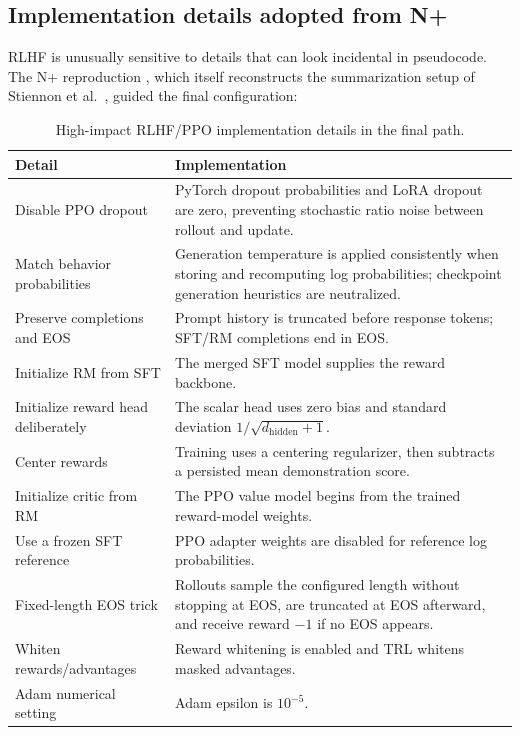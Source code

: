 \documentclass[11pt]{article}
\begin{document}
\subsection{Implementation details adopted from N+}

RLHF is unusually sensitive to details that can look incidental in pseudocode.
The N+ reproduction \cite{huang2024}, which itself reconstructs the
summarization setup of Stiennon et al.\ \cite{stiennon2020}, guided the final
configuration:

\begin{table}[H]
\centering
\small
\caption{High-impact RLHF/PPO implementation details in the final path.}
\label{tab:nplus}
\begin{tabularx}{\textwidth}{@{}p{}Y@{}}
\toprule
\textbf{Detail} & \textbf{Implementation}\\
\midrule
Disable PPO dropout &
PyTorch dropout probabilities and LoRA dropout are zero, preventing stochastic
ratio noise between rollout and update.\\
Match behavior probabilities &
Generation temperature is applied consistently when storing and recomputing
log probabilities; checkpoint generation heuristics are neutralized.\\
Preserve completions and EOS &
Prompt history is truncated before response tokens; SFT/RM completions end in
EOS.\\
Initialize RM from SFT &
The merged SFT model supplies the reward backbone.\\
Initialize reward head deliberately &
The scalar head uses zero bias and standard deviation
$1/\sqrt{d_{\mathrm{hidden}}+1}$.\\
Center rewards &
Training uses a centering regularizer, then subtracts a persisted mean
demonstration score.\\
Initialize critic from RM &
The PPO value model begins from the trained reward-model weights.\\
Use a frozen SFT reference &
PPO adapter weights are disabled for reference log probabilities.\\
Fixed-length EOS trick &
Rollouts sample the configured length without stopping at EOS, are truncated
at EOS afterward, and receive reward $-1$ if no EOS appears.\\
Whiten rewards/advantages &
Reward whitening is enabled and TRL whitens masked advantages.\\
Adam numerical setting &
Adam epsilon is $10^{-5}$.\\
\bottomrule
\end{tabularx}
\end{table}
\end{document}
